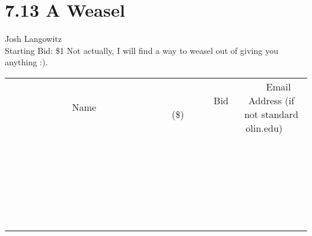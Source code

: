 \documentclass[11pt]{article}
\begin{document}
\section*{7.13 A Weasel}
Josh Langowitz
\\
Starting Bid: \$1
\newline
Not actually, I will find a way to weasel out of giving you anything :).
\\[6ex]
\begin{tabular}{c c c}
~~~~~~~~~~~~~Name~~~~~~~~~~~~~ & ~~~~~~~~~Bid (\$)~~~~~~~~~  & ~~~Email Address (if not standard olin.edu)~~~\\
 & & \\
\hline
 & & \\
\hline
 & & \\
\hline
 & & \\
\hline
 & & \\
\hline
 & & \\
\hline
 & & \\
\hline
 & & \\
\hline
 & & \\
\hline
 & & \\
\hline
 & & \\
\hline
 & & \\
\hline
 & & \\
\hline
 & & \\
\hline
 & & \\
\hline
 & & \\
\hline
 & & \\
\hline
 & & \\
\hline
 & & \\
\hline
 & & \\
\hline
 & & \\
\hline
 & & \\
\hline
 & & \\
\hline
 & & \\
\hline
 & & \\
\hline
 & & \\
\hline
\end{tabular}
\newpage
\end{document}
